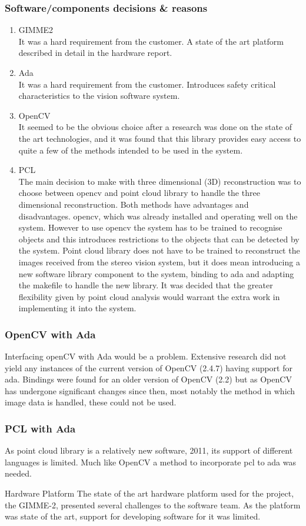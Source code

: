 \subsubsection{Software/components decisions \& reasons}
\begin{enumerate}
  \item GIMME2 \\ It was a hard requirement from the customer. A state of the art platform described in detail in the hardware report.
  \item Ada \\ It was a hard requirement from the customer. Introduces safety critical characteristics to the vision software system.
  \item OpenCV \\ It seemed to be the obvious choice after a research was done on the state of the art technologies, and it was found that this library provides easy access to quite a few of the methods intended to be used in the system.
  \item PCL \\ The main decision to make with three dimensional (3D) reconstruction was to choose between opencv and point cloud library to handle the three dimensional reconstruction. Both methods have advantages and disadvantages. opencv, which was already installed and operating well on the system. However to use opencv the system has to be trained to recognise objects and this introduces restrictions to the objects that can be detected by the system.
Point cloud library does not have to be trained to reconstruct the images received from the stereo vision system, but it does mean introducing a new software library component to the system, binding to ada and adapting the makefile to handle the new library.
It was decided that the greater flexibility given by point cloud analysis would warrant the extra work in implementing it into the system.
\end{enumerate}

\subsubsection{OpenCV with Ada}
Interfacing openCV with Ada would be a problem. Extensive research did not yield any instances of the current version of OpenCV (2.4.7) having support for ada. Bindings were found for an older version of OpenCV (2.2) \cite{web:oldAdaBindings} but as OpenCV has undergone significant changes since then, most notably the method in which image data is handled, these could not be used.

\subsubsection{PCL with Ada}
As point cloud library is a relatively new software, 2011, \cite{Rusu_ICRA2011_PCL} its support of different languages is limited. Much like OpenCV a method to incorporate pcl to ada was needed.

Hardware Platform
The state of the art hardware platform used for the project, the GIMME-2, presented several challenges to the software team. As the platform was state of the art, support for developing software for it was limited.